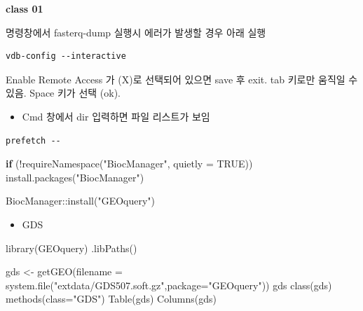 \documentclass[
]{book}
\newenvironment{Shaded}{\begin{snugshade}}{\end{snugshade}}
\newcommand{\AttributeTok}[1]{\textcolor[rgb]{0.77,0.63,0.00}{#1}}
\newcommand{\ConstantTok}[1]{\textcolor[rgb]{0.00,0.00,0.00}{#1}}
\newcommand{\ControlFlowTok}[1]{\textcolor[rgb]{0.13,0.29,0.53}{\textbf{#1}}}
\newcommand{\FunctionTok}[1]{\textcolor[rgb]{0.00,0.00,0.00}{#1}}
\newcommand{\NormalTok}[1]{#1}
\newcommand{\OtherTok}[1]{\textcolor[rgb]{0.56,0.35,0.01}{#1}}
\newcommand{\SpecialCharTok}[1]{\textcolor[rgb]{0.00,0.00,0.00}{#1}}
\newcommand{\StringTok}[1]{\textcolor[rgb]{0.31,0.60,0.02}{#1}}
\providecommand{\tightlist}{%
  \setlength{\itemsep}{0pt}\setlength{\parskip}{0pt}}
\begin{document}
\textbf{class 01}

명령창에서 fasterq-dump 실행시 에러가 발생할 경우 아래 실행

\begin{verbatim}
vdb-config --interactive
\end{verbatim}

Enable Remote Access 가 (X)로 선택되어 있으면 save 후 exit. tab 키로만 움직일 수 있음. Space 키가 선택 (ok).

\begin{itemize}
\tightlist
\item
  Cmd 창에서 dir 입력하면 파일 리스트가 보임
\end{itemize}

\begin{verbatim}
prefetch --
\end{verbatim}

\begin{Shaded}
\begin{Highlighting}[]

\ControlFlowTok{if}\NormalTok{ (}\SpecialCharTok{!}\FunctionTok{requireNamespace}\NormalTok{(}\StringTok{"BiocManager"}\NormalTok{, }\AttributeTok{quietly =} \ConstantTok{TRUE}\NormalTok{))}
    \FunctionTok{install.packages}\NormalTok{(}\StringTok{"BiocManager"}\NormalTok{)}

\NormalTok{BiocManager}\SpecialCharTok{::}\FunctionTok{install}\NormalTok{(}\StringTok{"GEOquery"}\NormalTok{)}
\end{Highlighting}
\end{Shaded}

\begin{itemize}
\tightlist
\item
  GDS
\end{itemize}

\begin{Shaded}
\begin{Highlighting}[]
\FunctionTok{library}\NormalTok{(GEOquery)}
\FunctionTok{.libPaths}\NormalTok{()}

\NormalTok{gds }\OtherTok{\textless{}{-}} \FunctionTok{getGEO}\NormalTok{(}\AttributeTok{filename =} \FunctionTok{system.file}\NormalTok{(}\StringTok{"extdata/GDS507.soft.gz"}\NormalTok{,}\AttributeTok{package=}\StringTok{"GEOquery"}\NormalTok{))}
\NormalTok{gds  }
\FunctionTok{class}\NormalTok{(gds)}
\FunctionTok{methods}\NormalTok{(}\AttributeTok{class=}\StringTok{"GDS"}\NormalTok{)}
\FunctionTok{Table}\NormalTok{(gds)}
\FunctionTok{Columns}\NormalTok{(gds)}
\end{Highlighting}
\end{Shaded}
\end{document}
